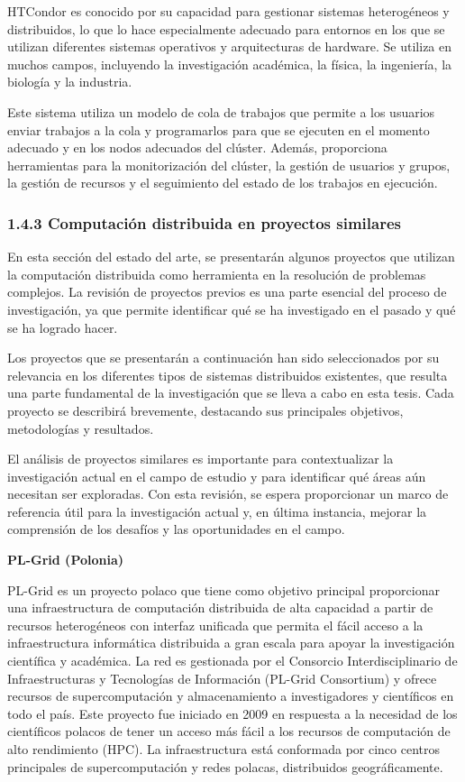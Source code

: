 \begin{spacing}{1.5}
  HTCondor es conocido por su capacidad para gestionar sistemas heterogéneos y distribuidos, lo que lo hace especialmente adecuado para entornos en los que se utilizan diferentes sistemas operativos y arquitecturas de hardware. Se utiliza en muchos campos, incluyendo la investigación académica, la física, la ingeniería, la biología y la industria.

  Este sistema utiliza un modelo de cola de trabajos que permite a los usuarios enviar trabajos a la cola y programarlos para que se ejecuten en el momento adecuado y en los nodos adecuados del clúster. Además, proporciona herramientas para la monitorización del clúster, la gestión de usuarios y grupos, la gestión de recursos y el seguimiento del estado de los trabajos en ejecución.

  \subsubsection{1.4.3 Computación distribuida en proyectos similares}

  En esta sección del estado del arte, se presentarán algunos proyectos que utilizan la computación distribuida como herramienta en la resolución de problemas complejos. La revisión de proyectos previos es una parte esencial del proceso de investigación, ya que permite identificar qué se ha investigado en el pasado y qué se ha logrado hacer.

  Los proyectos que se presentarán a continuación han sido seleccionados por su relevancia en los diferentes tipos de sistemas distribuidos existentes, que resulta una parte fundamental de la investigación que se lleva a cabo en esta tesis. Cada proyecto se describirá brevemente, destacando sus principales objetivos, metodologías y resultados.

  El análisis de proyectos similares es importante para contextualizar la investigación actual en el campo de estudio y para identificar qué áreas aún necesitan ser exploradas. Con esta revisión, se espera proporcionar un marco de referencia útil para la investigación actual y, en última instancia, mejorar la comprensión de los desafíos y las oportunidades en el campo.

  \textbf{PL-Grid (Polonia)}

  PL-Grid es un proyecto polaco que tiene como objetivo principal proporcionar una infraestructura de computación distribuida de alta capacidad a partir de recursos heterogéneos con interfaz unificada que permita el fácil acceso a la infraestructura informática distribuida a gran escala para apoyar la investigación científica y académica. La red es gestionada por el Consorcio Interdisciplinario de Infraestructuras y Tecnologías de Información (PL-Grid Consortium) y ofrece recursos de supercomputación y almacenamiento a investigadores y científicos en todo el país. Este proyecto fue iniciado en 2009 en respuesta a la necesidad de los científicos polacos de tener un acceso más fácil a los recursos de computación de alto rendimiento (HPC). La infraestructura está conformada por cinco centros principales de supercomputación y redes polacas, distribuidos geográficamente.


\end{spacing}
